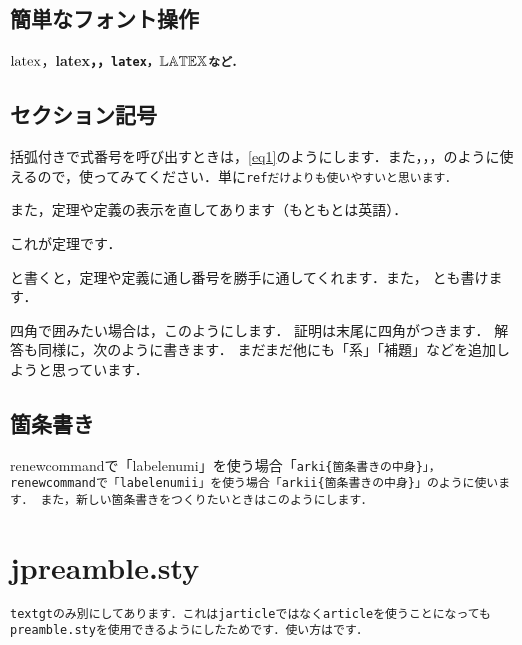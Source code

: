 \documentclass[a4paper, 9pt]{jsarticle}
\begin{document}
\subsection{簡単なフォント操作}
$\rm{latex}$，\bf{latex}，，\tt{latex}，$\bb{LATEX}$など．
\subsection{セクション記号}
括弧付きで式番号を呼び出すときは，\ref{eq1}のようにします．また，，，のように使えるので，使ってみてください．単に\tt{ref}だけよりも使いやすいと思います．\par 
また，定理や定義の表示を直してあります（もともとは英語）．
\begin{theorem}
	これが定理です．
\end{theorem}
と書くと，定理や定義に通し番号を勝手に通してくれます．また，
とも書けます．\par 
四角で囲みたい場合は，このようにします．
証明は末尾に四角がつきます．
解答も同様に，次のように書きます．
まだまだ他にも「系」「補題」などを追加しようと思っています．
\subsection{箇条書き}
renewcommandで「labelenumi」を使う場合「\tt{arki}\{箇条書きの中身\}」，renewcommandで「labelenumii」を使う場合「\tt{arkii}\{箇条書きの中身\}」のように使います．
また，新しい箇条書きをつくりたいときはこのようにします．
\section{jpreamble.sty}
\tt{textgt}のみ別にしてあります．これは\tt{jarticle}ではなく\tt{article}を使うことになっても\tt{preamble.sty}を使用できるようにしたためです．使い方はです．
\end{document}
